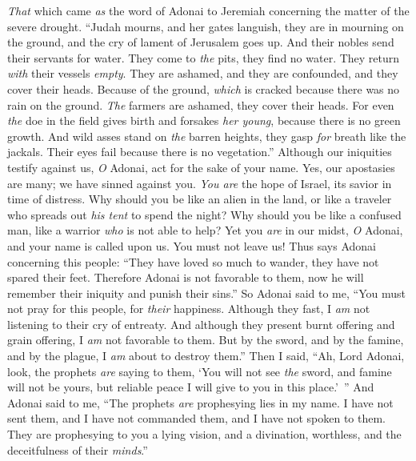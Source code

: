 \begin{biblechapter} %
 \textit{That} which came \textit{as} the word of Adonai to Jeremiah concerning the matter of the severe drought.
\verse “Judah mourns, and her gates languish, 
they are in mourning on the ground, 
and the cry of lament of Jerusalem goes up.
\verse And their nobles send their servants for water. 
They come to \textit{the} pits, they find no water. 
They return \textit{with} their vessels \textit{empty}. 
They are ashamed, and they are confounded, 
and they cover their heads.
\verse Because of the ground, \textit{which} is cracked 
because there was no rain on the ground. 
\textit{The} farmers are ashamed, 
they cover their heads.
\verse For even \textit{the} doe in the field gives birth and forsakes \textit{her young}, 
because there is no green growth.
\verse And wild asses stand on \textit{the} barren heights, 
they gasp \textit{for} breath like the jackals. 
Their eyes fail 
because there is no vegetation.”
\verse Although our iniquities testify against us, \textit{O} Adonai, 
act for the sake of your name. 
Yes, our apostasies are many; 
we have sinned against you.
\verse \textit{You are} the hope of Israel, 
its savior in time of distress. 
Why should you be like an alien in the land, 
or like a traveler who spreads out \textit{his tent}  to spend the night?
\verse Why should you be like a confused man, 
like a warrior \textit{who} is not able to help? 
Yet you \textit{are} in our midst, \textit{O} Adonai, 
and your name is called upon us. 
You must not leave us!
\verse Thus says Adonai concerning this people: “They have loved so much to wander, 
they have not spared their feet. 
Therefore Adonai is not favorable to them, 
now he will remember their iniquity and punish their sins.”
 So Adonai said to me, “You must not pray for this people, for \textit{their} happiness.
\verse Although they fast, I \textit{am} not listening to their cry of entreaty. And although they present burnt offering and grain offering, I \textit{am} not favorable to them. But by the sword, and by the famine, and by the plague, I \textit{am} about to destroy them.”
\verse Then I said, “Ah, Lord Adonai, look, the prophets \textit{are} saying to them, ‘You will not see \textit{the} sword, and famine will not be yours, but reliable peace I will give to you in this place.’ ”
\verse And Adonai said to me, “The prophets \textit{are} prophesying lies in my name. I have not sent them, and I have not commanded them, and I have not spoken to them. They are prophesying to you a lying vision, and a divination, worthless, and the deceitfulness of their \textit{minds}.”

\end{biblechapter}
